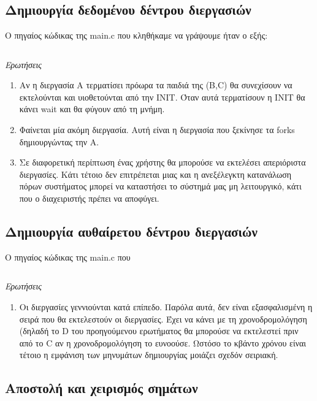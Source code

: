 \documentclass[a4paper,10pt]{article} \usepackage{anysize}
\begin{document}


\section*{} \setcounter{section}{1}
\subsection{Δημιουργία δεδομένου δέντρου διεργασιών} Ο πηγαίος κώδικας της main.c που
κληθήκαμε να γράψουμε ήταν ο εξής:

\inputminted[linenos,fontsize=\footnotesize,frame=leftline]{c}{files/ask2-fork.c}
\emph{Ερωτήσεις}
\begin{enumerate}
\item Αν η διεργασία A τερματίσει πρόωρα τα παιδιά της (B,C) θα συνεχίσουν να
εκτελούνται και υιοθετούνται από την INIT. Όταν αυτά τερματίσουν η INIT θα
κάνει wait και θα φύγουν από τη μνήμη.
\item Φαίνεται μία ακόμη διεργασία. Αυτή είναι η διεργασία που ξεκίνησε τα
forks δημιουργώντας την A.
\item Σε διαφορετική περίπτωση ένας χρήστης θα μπορούσε να εκτελέσει
απεριόριστα διεργασίες. Κάτι τέτοιο δεν επιτρέπεται μιας και η ανεξέλεγκτη
κατανάλωση πόρων συστήματος μπορεί να καταστήσει το σύστημά μας μη
λειτουργικό, κάτι που ο διαχειριστής πρέπει να αποφύγει.
\end{enumerate}


\subsection{Δημιουργία αυθαίρετου δέντρου διεργασιών} Ο πηγαίος κώδικας της main.c που
\inputminted[linenos,fontsize=\footnotesize,frame=leftline]{c}{files/ask2-tree.c}
\emph{Ερωτήσεις}
\begin{enumerate}
\item Οι διεργασίες γεννιούνται κατά επίπεδο. Παρόλα αυτά, δεν είναι
εξασφαλισμένη η σειρά που θα εκτελεστούν οι διεργασίες. Έχει να κάνει με τη
χρονοδρομολόγηση (δηλαδή το D του προηγούμενου ερωτήματος θα μπορούσε να
εκτελεστεί πριν από το C αν η χρονοδρομολόγηση το ευνοούσε. 
Ωστόσο το κβάντο χρόνου είναι τέτοιο η εμφάνιση των
μηνυμάτων δημιουργίας μοιάζει σχεδόν σειριακή.
\end{enumerate}


\subsection{Αποστολή και χειρισμός σημάτων}
\end{document}
